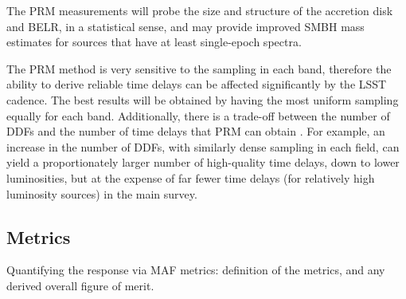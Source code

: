 The PRM measurements will probe the size and structure of the
accretion disk and BELR, in a statistical sense, and may provide
improved SMBH mass estimates for sources that have at least
single-epoch spectra. 

The PRM method is very sensitive to the sampling in each band,
therefore the ability to derive reliable time delays can be affected
significantly by the LSST cadence. The best results will be obtained
by having the most uniform sampling equally for each band.
Additionally, there is a trade-off between the number of DDFs and the
number of time delays that PRM can obtain \citep{CheloucheEtal2014}.
For example, an increase in the number of DDFs, with similarly dense
sampling in each field, can yield a proportionately larger number of
high-quality time delays, down to lower luminosities, but at the
expense of far fewer time delays (for relatively high luminosity
sources) in the main survey.



\subsection{Metrics}
\label{sec:\secname:metrics}

Quantifying the response via MAF metrics: definition of the metrics,
and any derived overall figure of merit.



